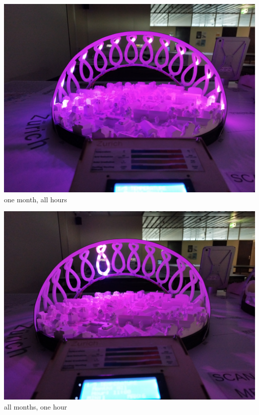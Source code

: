 \documentclass[a4paper,9pt]{article}
\begin{document}
 \begin{minipage}{0.31\linewidth}
    \centering
    \includegraphics[width=.95\linewidth]{Images/m.jpg}
    \\{one month, all hours}
\end{minipage}
\hfill
\begin{minipage}{0.31\linewidth}
    \centering
    \includegraphics[width=.95\linewidth]{Images/h.jpg}
    \\{all months, one hour}
\end{minipage}
\hfill
\end{document}
